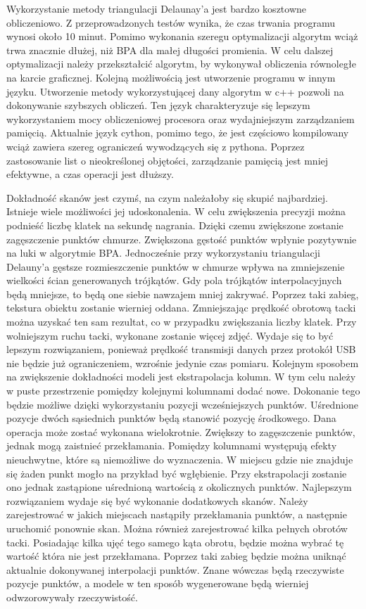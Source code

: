 Wykorzystanie metody triangulacji Delaunay'a jest bardzo kosztowne obliczeniowo. Z przeprowadzonych testów wynika, że czas trwania programu wynosi około 10 minut. Pomimo wykonania szeregu optymalizacji algorytm wciąż trwa znacznie dłużej, niż BPA dla małej długości promienia. W celu dalszej optymalizacji należy przekształcić algorytm, by wykonywał obliczenia równoległe na karcie graficznej. Kolejną możliwością jest utworzenie programu w innym języku. Utworzenie metody wykorzystującej dany algorytm w c++ pozwoli na dokonywanie szybszych obliczeń. Ten język charakteryzuje się lepszym wykorzystaniem mocy obliczeniowej procesora oraz wydajniejszym zarządzaniem pamięcią. Aktualnie język cython, pomimo tego, że jest częściowo kompilowany wciąż zawiera szereg ograniczeń wywodzących się z pythona. Poprzez zastosowanie list o nieokreślonej objętości, zarządzanie pamięcią jest mniej efektywne, a czas operacji jest dłuższy. 

Dokładność skanów jest czymś, na czym należałoby się skupić najbardziej. Istnieje wiele możliwości jej udoskonalenia. W celu zwiększenia precyzji można podnieść liczbę klatek na sekundę nagrania. Dzięki czemu zwiększone zostanie zagęszczenie punktów chmurze. Zwiększona gęstość punktów wpłynie pozytywnie na luki w algorytmie BPA. Jednocześnie przy wykorzystaniu triangulacji Delauny'a gęstsze rozmieszczenie punktów w chmurze wpływa na zmniejszenie wielkości ścian generowanych trójkątów. Gdy pola trójkątów interpolacyjnych będą mniejsze, to będą one siebie nawzajem mniej zakrywać. Poprzez taki zabieg, tekstura obiektu zostanie wierniej oddana. Zmniejszając prędkość obrotową tacki można uzyskać ten sam rezultat, co w przypadku zwiększania liczby klatek. Przy wolniejszym ruchu tacki, wykonane zostanie więcej zdjęć. Wydaje się to być lepszym rozwiązaniem, ponieważ prędkość transmisji danych przez protokół USB nie będzie już ograniczeniem, wzrośnie jedynie czas pomiaru. Kolejnym sposobem na zwiększenie dokładności modeli jest ekstrapolacja kolumn. W tym celu należy w puste przestrzenie pomiędzy kolejnymi kolumnami dodać nowe. Dokonanie tego będzie możliwe dzięki wykorzystaniu pozycji wcześniejszych punktów. Uśrednione pozycje dwóch sąsiednich punktów będą stanowić pozycję środkowego. Dana operacja może zostać wykonana wielokrotnie. Zwiększy to zagęszczenie punktów, jednak mogą zaistnieć przekłamania. Pomiędzy kolumnami występują efekty nieuchwytne, które są niemożliwe do wyznaczenia. W miejscu gdzie nie znajduje się żaden punkt mogło na przykład być wgłębienie. Przy ekstrapolacji zostanie ono jednak zastąpione uśrednioną wartością z okolicznych punktów. Najlepszym rozwiązaniem wydaje się być wykonanie dodatkowych skanów. Należy zarejestrować w jakich miejscach nastąpiły przekłamania punktów, a następnie uruchomić ponownie skan. Można również zarejestrować kilka pełnych obrotów tacki. Posiadając kilka ujęć tego samego kąta obrotu, będzie można wybrać tę wartość która nie jest przekłamana. Poprzez taki zabieg będzie można uniknąć aktualnie dokonywanej interpolacji punktów. Znane wówczas będą rzeczywiste pozycje punktów, a modele w ten sposób wygenerowane będą wierniej odwzorowywały rzeczywistość. 


